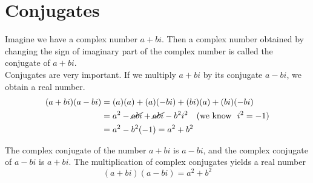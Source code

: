 \section{Conjugates}
Imagine we have a complex number $a+bi$. Then a complex number obtained by changing the sign of imaginary part of the complex number is called the conjugate of $a+bi$.\\
Conjugates are very important. If we multiply $a+bi$ by its conjugate $a-bi$, we obtain a real number.
\begin{align*}
    (a+bi)(a-bi) &= (a)(a)+(a)(-bi)+(bi)(a)+(bi)(-bi) \\
    &=a^2-\cancel{abi}+\cancel{abi}-b^2i^2\quad 
    (\text{we know}\ \ i^2=-1)\\
    &=a^2-b^2(-1) =a^2+b^2
\end{align*}
	\begin{tcolorbox}[title=Conjugate of a complex number,fonttitle=\bfseries,
	colframe=blue!70!red,
	colback=white]
    The complex conjugate of the number $a+bi$ is $a-bi$, and the complex conjugate of $a-bi$ is $a+bi$. The multiplication of complex conjugates yields a real number
    \begin{equation*}
        (a+bi)(a-bi) = a^2+b^2
    \end{equation*}
	\end{tcolorbox}
